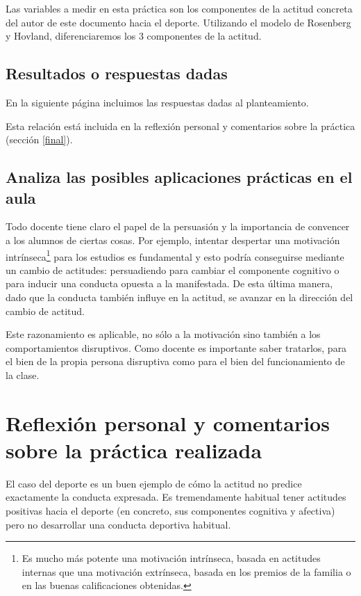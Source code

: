 \documentclass[palatino,nochap]{apuntesURJC}
\begin{document}
Las variables a medir en esta práctica son los componentes de la actitud concreta del autor de este documento hacia el deporte.
%
Utilizando el modelo de Rosenberg y Hovland, diferenciaremos los 3 componentes de la actitud.

\subsection{Resultados o respuestas dadas}

En la siguiente página incluimos las respuestas dadas al planteamiento.



Esta relación está incluida en la reflexión personal y comentarios sobre la práctica (sección \ref{final}).


\subsection{Analiza las posibles aplicaciones prácticas en el aula}


Todo docente tiene claro el papel de la persuasión y la importancia de convencer a los alumnos de ciertas cosas.
%
Por ejemplo, intentar despertar una motivación intrínseca\footnote{Es mucho más potente una motivación intrínseca, basada en actitudes internas que una motivación extrínseca, basada en los premios de la familia o en las buenas calificaciones obtenidas.} para los estudios es fundamental y esto podría conseguirse mediante un cambio de actitudes:
%
persuadiendo para cambiar el componente cognitivo o para inducir una conducta opuesta a la manifestada. 
%
De esta última manera, dado que la conducta también influye en la actitud, se avanzar en la dirección del cambio de actitud.

Este razonamiento es aplicable, no sólo a la motivación sino también a los comportamientos disruptivos.
%
Como docente es importante saber tratarlos, para el bien de la propia persona disruptiva como para el bien del funcionamiento de la clase.



\section{Reflexión personal y comentarios sobre la práctica realizada}

El caso del deporte es un buen ejemplo de cómo la actitud no predice exactamente la conducta expresada.
%
Es tremendamente habitual tener actitudes positivas hacia el deporte (en concreto, sus componentes cognitiva y afectiva) pero no desarrollar una conducta deportiva habitual.
\end{document}
